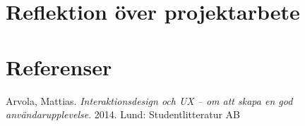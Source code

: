\documentclass[a4paper,12pt,titlepage]{article}
\begin{document}
\section*{Reflektion över projektarbete}


\section*{Referenser}

Arvola, Mattias. \textit{Interaktionsdesign och UX -- om att skapa en god
användarupplevelse}. 2014. Lund: Studentlitteratur AB
\end{document}
